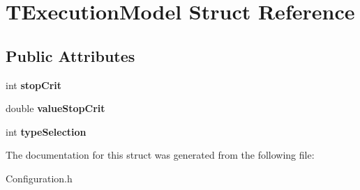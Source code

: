 \hypertarget{structTExecutionModel}{}\section{T\+Execution\+Model Struct Reference}
\label{structTExecutionModel}
\subsection*{Public Attributes}
\begin{DoxyCompactItemize}
\item 
\mbox{\label{structTExecutionModel_ad6ff50f5ebf1f448ed8a9ed8502ccef8}} 
int {\bfseries stop\+Crit}
\item 
\mbox{\label{structTExecutionModel_a25ed1c5945f7ffdc94c305468dcb0a2e}} 
double {\bfseries value\+Stop\+Crit}
\item 
\mbox{\label{structTExecutionModel_a90817c3669709d982c71f1ff1ecc8882}} 
int {\bfseries type\+Selection}
\end{DoxyCompactItemize}


The documentation for this struct was generated from the following file\+:\begin{DoxyCompactItemize}
\item 
Configuration.\+h\end{DoxyCompactItemize}
